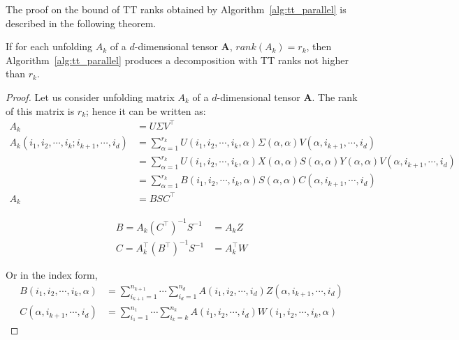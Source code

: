 \documentclass[runningheads]{llncs}
\newcommand{\tensor}[1]{\cal\textbf{#1}\xspace}
\begin{document}
\noindent The proof on the bound of TT ranks obtained by Algorithm~\ref{alg:tt_parallel} is described in the following theorem.

\begin{theorem}
	If for each unfolding $A_k$ of a $d$-dimensional tensor \tensor{A}, $rank(A_k)=r_k$, then Algorithm~\ref{alg:tt_parallel} produces a decomposition with TT ranks not higher than $r_k$.
\end{theorem}
\begin{proof}
	Let us consider unfolding matrix $A_k$ of a $d$-dimensional tensor \tensor{A}. The rank of this matrix is $r_k$; hence it can be written as:
	\begin{align*}
	A_k &= U \Sigma V^\intercal\\
	A_k(i_1,i_2,\cdots,i_k;i_{k+1},\cdots, i_d) &= \sum_{\alpha=1}^{r_k} U(i_1,i_2,\cdots,i_k, \alpha)\Sigma(\alpha, \alpha)V(\alpha,i_{k+1},\cdots, i_d)\\
	&= \sum_{\alpha=1}^{r_k} U(i_1,i_2,\cdots,i_k, \alpha)X(\alpha, \alpha)S(\alpha, \alpha)Y(\alpha, \alpha)V(\alpha,i_{k+1},\cdots, i_d)\\
	&= \sum_{\alpha=1}^{r_k} B(i_1,i_2,\cdots,i_k, \alpha)S(\alpha, \alpha)C(\alpha,i_{k+1},\cdots, i_d)\\
	A_k &= BSC^\intercal
	\end{align*}	

	\begin{align*}
B = A_k (C^\intercal)^{-1}S^{-1} &= A_kZ\\
C = A_k^\intercal (B^\intercal)^{-1}S^{-1} &= A_k^\intercal W
\end{align*}
	
	\noindent Or in the index form,
	\begin{align*}
	B(i_1,i_2,\cdots, i_k, \alpha) &= \sum_{i_{k+1}=1}^{n_{k+1}}\cdots\sum_{i_d=1}^{n_d} A(i_1, i_2, \cdots, i_d) Z(\alpha, i_{k+1},\cdots, i_d)\\
	C(\alpha, i_{k+1},\cdots, i_d) &= \sum_{i_1=1}^{n_1} \cdots \sum_{i_k=k}^{n_k} A(i_1, i_2, \cdots, i_d) W(i_1,i_2,\cdots, i_k, \alpha)
	\end{align*}
	

\end{proof}
\end{document}
